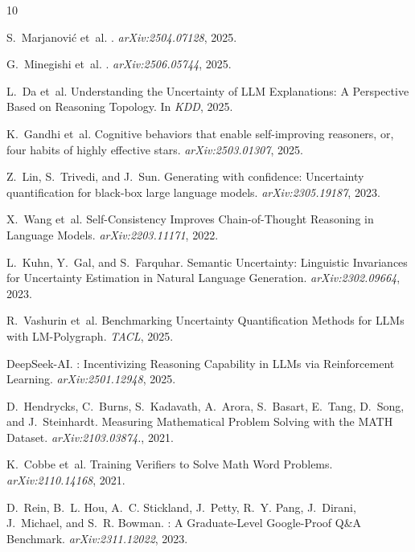 \documentclass{article}
\begin{document}

\begin{thebibliography}{10}

S.~Marjanovi\'{c} et~al.
.
\newblock \emph{arXiv:2504.07128}, 2025.

G.~Minegishi et~al.
.
\newblock \emph{arXiv:2506.05744}, 2025.

L.~Da et~al.
\newblock Understanding the Uncertainty of {LLM} Explanations: A Perspective
  Based on Reasoning Topology.
\newblock In \emph{KDD}, 2025.

K.~Gandhi et~al.
\newblock Cognitive behaviors that enable self-improving reasoners, or, four habits of highly effective stars.
\newblock \emph{arXiv:2503.01307}, 2025.

Z.~Lin, S.~Trivedi, and J.~Sun.
\newblock Generating with confidence: Uncertainty quantification for black-box large language models.
\newblock \emph{arXiv:2305.19187}, 2023.

X.~Wang et~al.
\newblock Self-Consistency Improves Chain-of-Thought Reasoning in Language
  Models.
\newblock \emph{arXiv:2203.11171}, 2022.

L.~Kuhn, Y.~Gal, and S.~Farquhar.
\newblock Semantic Uncertainty: Linguistic Invariances for Uncertainty
  Estimation in Natural Language Generation.
\newblock \emph{arXiv:2302.09664}, 2023.

R.~Vashurin et~al.
\newblock Benchmarking Uncertainty Quantification Methods for {LLMs} with
  {LM-Polygraph}.
\newblock \emph{TACL}, 2025.

{DeepSeek-AI}.
: Incentivizing Reasoning Capability in {LLMs} via
  Reinforcement Learning.
\newblock \emph{arXiv:2501.12948}, 2025.

D.~Hendrycks, C.~Burns, S.~Kadavath, A.~Arora, S.~Basart, E.~Tang, D.~Song,
  and J.~Steinhardt.
\newblock Measuring Mathematical Problem Solving with the {MATH} Dataset.
\newblock \emph{arXiv:2103.03874.}, 2021.

K.~Cobbe et~al.
\newblock Training Verifiers to Solve Math Word Problems.
\newblock \emph{arXiv:2110.14168}, 2021.

D.~Rein, B.~L. Hou, A.~C. Stickland, J.~Petty, R.~Y. Pang, J.~Dirani,
  J.~Michael, and S.~R. Bowman.
: A Graduate-Level Google-Proof {Q\&A} Benchmark.
\newblock \emph{arXiv:2311.12022}, 2023.


\end{thebibliography}
\end{document}

